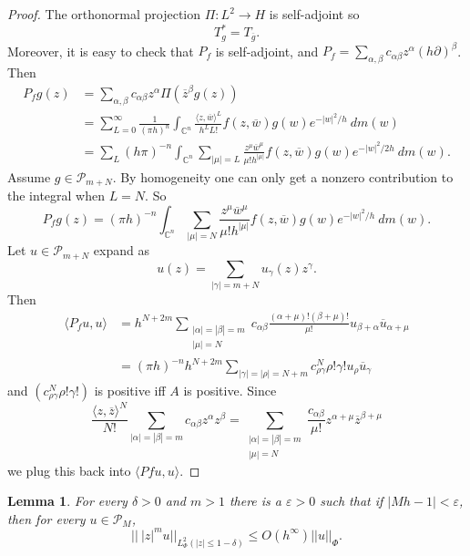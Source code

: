 \documentclass[12pt]{report}
\newcommand{\CC}{\mathbb{C}}
\newtheorem{lemma}[theorem]{Lemma}
\theoremstyle{definition}
\begin{document}
\begin{proof}
    The orthonormal projection $\Pi: L^2 \to H$ is self-adjoint so
    $$T_g^* = T_{\overline g}.$$
    Moreover, it is easy to check that $P_f$ is self-adjoint, and $P_f = \sum_{\alpha,\beta} c_{\alpha\beta} z^\alpha (h\partial)^\beta$. Then
\begin{align*}P_fg(z) &= \sum_{\alpha,\beta} c_{\alpha\beta} z^\alpha \Pi(\overline z^\beta g(z)) \\
&= \sum_{L=0}^\infty \frac{1}{(\pi h)^n} \int_{\CC^n} \frac{\langle z, \overline w\rangle^L}{h^LL!} f(z, \overline w) g(w) e^{-|w|^2/h} ~dm(w)\\
&= \sum_L (h\pi)^{-n} \int_{\CC^n} \sum_{|\mu| = L} \frac{z^\mu \overline w^\mu}{\mu! h^{|\mu|}} f(z, \overline w) g(w) e^{-|w|^2/2h} ~dm(w).
\end{align*}
Assume $g \in \mathcal P_{m + N}$. By homogeneity one can only get a nonzero contribution to the integral when $L = N$. So
$$P_fg(z) = (\pi h)^{-n} \int_{\CC^n} \sum_{|\mu| = N} \frac{z^\mu \overline w^\mu}{\mu! h^{|\mu|}} f(z, \overline w) g(w) e^{-|w|^2/h} ~dm(w).$$
Let $u \in \mathcal P_{m + N}$ expand as
$$u(z) = \sum_{|\gamma| = m + N} u_\gamma(z) z^\gamma.$$
Then
\begin{align*}\langle P_fu, u\rangle &=
h^{N + 2m}\sum_{\substack{|\alpha| = |\beta| = m\\|\mu| = N}} c_{\alpha\beta} \frac{(\alpha + \mu)!(\beta + \mu)!}{\mu!}u_{\beta + \alpha} \overline u_{\alpha + \mu}\\
&= (\pi h)^{-n} h^{N+2m} \sum_{|\gamma| = |\rho| = N + m} c^N_{\rho\gamma} \rho! \gamma! u_\rho \overline u_\gamma
\end{align*}
and $(c^N_{\rho\gamma}\rho!\gamma!)$ is positive iff $A$ is positive. Since
$$\frac{\langle z, \overline z\rangle^N}{N!} \sum_{|\alpha|=|\beta|=m} c_{\alpha\beta}z^\alpha z^\beta = \sum_{\substack{|\alpha| = |\beta| =m\\|\mu| = N}} \frac{c_{\alpha\beta}}{\mu!} z^{\alpha + \mu} \overline z^{\beta + \mu}$$
we plug this back into $\langle Pf u, u\rangle$.
\end{proof}
\begin{lemma}
    For every $\delta > 0$ and $m > 1$ there is a $\varepsilon > 0$ such that if $|Mh - 1| < \varepsilon$, then for every $u \in \mathcal P_M$,
    $$||~|z|^mu||_{L^2_\Phi(|z| \leq 1 - \delta)} \leq O(h^\infty)||u||_\Phi.$$
\end{lemma}
\end{document}
